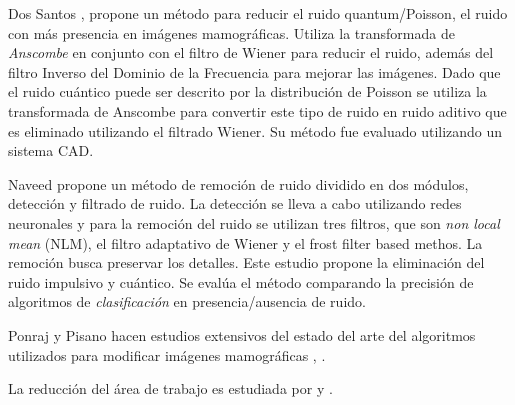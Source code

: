 
Dos Santos \cite{romualdopre}, \cite{dos2009mammography} propone un método para
reducir el ruido quantum/Poisson, el ruido con más presencia en imágenes mamográficas.
Utiliza la transformada de \textit{Anscombe} en conjunto con el filtro de
Wiener para reducir el ruido, además del filtro Inverso del Dominio de la
Frecuencia para mejorar las imágenes. Dado que el ruido cuántico puede ser
descrito por la distribución de Poisson se utiliza la transformada de Anscombe
para convertir este tipo de ruido en ruido aditivo que es eliminado utilizando
el filtrado Wiener. Su método fue evaluado utilizando un sistema CAD. 

Naveed \cite{naveed2012quantum} propone un método de remoción de ruido dividido
en dos módulos, detección y filtrado de ruido. La detección se lleva a cabo
utilizando redes neuronales y para la remoción del ruido se utilizan tres
filtros, que son \textit{non local mean} (NLM), el filtro adaptativo de Wiener
y el frost filter based methos. La remoción busca preservar los detalles. Este
estudio propone la eliminación del ruido impulsivo y cuántico. Se evalúa el
método comparando la precisión de algoritmos de \textit{clasificación} en
presencia/ausencia de ruido.


Ponraj y Pisano hacen estudios extensivos del estado del arte del algoritmos
utilizados para modificar imágenes mamográficas \cite{ponraj2011survey},
\cite{pisano2000image}.

La reducción del área de trabajo es estudiada por \cite{holguinpre} y
\cite{dehghani2011method}.


